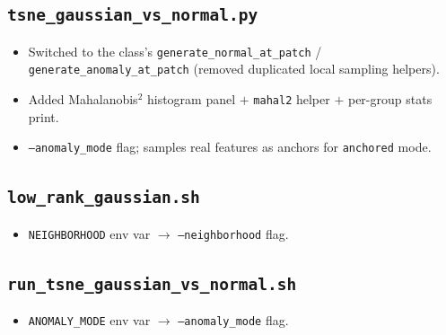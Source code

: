 \documentclass[11pt]{article}
\newcommand{\code}[1]{\texttt{#1}}
\begin{document}
\subsection*{\code{tsne\_gaussian\_vs\_normal.py}}
\begin{itemize}[noitemsep]
  \item Switched to the class's \code{generate\_normal\_at\_patch} /
    \code{generate\_anomaly\_at\_patch} (removed duplicated local sampling
    helpers).
  \item Added Mahalanobis$^2$ histogram panel $+$ \code{mahal2} helper $+$
    per-group stats print.
  \item \code{--anomaly\_mode} flag; samples real features as anchors for
    \code{anchored} mode.
\end{itemize}

\subsection*{\code{low\_rank\_gaussian.sh}}
\begin{itemize}[noitemsep]
  \item \code{NEIGHBORHOOD} env var $\to$ \code{--neighborhood} flag.
\end{itemize}

\subsection*{\code{run\_tsne\_gaussian\_vs\_normal.sh}}
\begin{itemize}[noitemsep]
  \item \code{ANOMALY\_MODE} env var $\to$ \code{--anomaly\_mode} flag.
\end{itemize}
\end{document}
